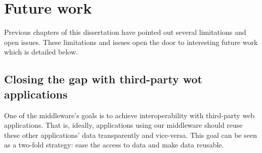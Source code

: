 \section{Future work}


Previous chapters of this dissertation have pointed out several limitations and open issues.
These limitations and issues open the door to interesting future work which is detailed below.


\subsection{Closing the gap with third-party \acs{wot} applications}

One of the middleware's goals is to achieve interoperability with third-party web applications.
That is, ideally, applications using our middleware should reuse these other applications' data transparently and vice-versa.
This goal can be seen as a two-fold strategy: ease the access to data and make data reusable.

